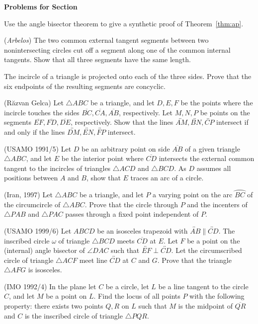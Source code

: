 \documentclass[12pt]{book}
\newcounter{exc}
\numberwithin{exc}{section}
\numberwithin{figure}{section}
\newenvironment{exer}{\vspace{0.1in}
\noindent \textbf{Problems for Section~\thesection} \vspace{0.1in}
\begin{list}{\arabic{exc}.}{\usecounter{exc}}}{\end{list}}
\numberwithin{equation}{theorem}
\def\ii{\item}
\def\line#1{\overleftrightarrow{#1}}
\def\seg#1{\overline{#1}}
\def\arc#1{\wideparen{#1}}
\begin{document}
\begin{exer}
\ii
Use the angle bisector theorem to give a synthetic proof of 
Theorem~\ref{thm:ap}.

\ii (\emph{Arbelos})
The two common external tangent 
segments between two nonintersecting circles cut off a segment along
one of the common internal tangents. Show that all three segments have
the same length.

\item
The incircle of a triangle is projected onto each of the three sides.
Prove that the six endpoints of the resulting segments are concyclic.

\ii
(R\u{a}zvan Gelca) 
Let $\triangle ABC$ be a triangle, and let
$D, E, F$ be the points where the incircle
touches the sides $\seg{BC}, \seg{CA}, \seg{AB}$, 
respectively. Let $M, N, P$ be points
on the segments $\seg{EF}, \seg{FD}, \seg{DE}$, respectively. Show that the 
lines $\line{AM},
\line{BN}, \line{CP}$ intersect if and only if the lines
 $\line{DM}, \line{EN}, \line{FP}$ intersect.

\ii \label{ex:usamo91}
(USAMO 1991/5)
Let $D$ be an arbitrary point on side $\seg{AB}$ of a given triangle 
$\triangle ABC$, 
and let $E$ be the interior point where $\seg{CD}$ intersects the external 
common tangent to the incircles of triangles $\triangle ACD$ and 
$\triangle BCD$. As $D$ 
assumes all positions between $A$ and $B$, show that $E$ traces an arc 
of a circle.

\ii (Iran, 1997) \label{ex:iran97}
Let $\triangle ABC$ be a triangle, and let
$P$ a varying point on the arc $\arc{BC}$ of 
the circumcircle of $\triangle ABC$. 
Prove that the circle through $P$ and the 
incenters of $\triangle PAB$ and $\triangle PAC$ 
passes through a fixed point independent 
of $P$.

\ii (USAMO 1999/6) \label{ex:usamo1999}
Let $ABCD$ be an isosceles trapezoid with $\line{AB} \parallel \line{CD}$. 
The inscribed
circle $\omega$ of triangle $\triangle BCD$ meets $\seg{CD}$ 
at $E$. Let $F$ be a point on
the (internal) angle bisector of $\angle DAC$ such that $\line{EF} \perp 
\line{CD}$. Let the
circumscribed circle of triangle $\triangle ACF$ meet line $\line{CD}$ 
at $C$ and $G$. Prove
that the triangle $\triangle AFG$ is isosceles.

\ii (IMO 1992/4) \label{ex:imo1992}
In the plane let $C$ be a circle, let $L$ be a line tangent
to the circle $C$, and let $M$ be a point on $L$.
Find the locus of all points $P$ with the following 
property: there exists two points $Q, R$ on $L$
such that $M$ is the midpoint of $\seg{QR}$ and $C$
is the inscribed circle of triangle $\triangle PQR$.


\end{exer}
\end{document}
